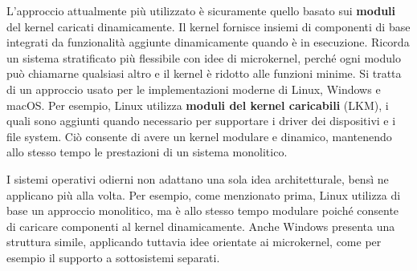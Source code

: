 \noindent L'approccio attualmente più utilizzato è sicuramente quello basato sui \textbf{moduli} del kernel caricati dinamicamente. Il kernel fornisce insiemi di componenti di base integrati da funzionalità aggiunte dinamicamente quando è in esecuzione. Ricorda un sistema stratificato più flessibile con idee di microkernel, perché ogni modulo può chiamarne qualsiasi altro e il kernel è ridotto alle funzioni minime. Si tratta di un approccio usato per le implementazioni moderne di Linux, Windows e macOS. Per esempio, Linux utilizza \textbf{moduli del kernel caricabili} (LKM), i quali sono aggiunti quando necessario per supportare i driver dei dispositivi e i file system. Ciò consente di avere un kernel modulare e dinamico, mantenendo allo stesso tempo le prestazioni di un sistema monolitico.\par
I sistemi operativi odierni non adattano una sola idea architetturale, bensì ne applicano più alla volta. Per esempio, come menzionato prima, Linux utilizza di base un approccio monolitico, ma è allo stesso tempo modulare poiché consente di caricare componenti al kernel dinamicamente. Anche Windows presenta una struttura simile, applicando tuttavia idee orientate ai microkernel, come per esempio il supporto a sottosistemi separati.
